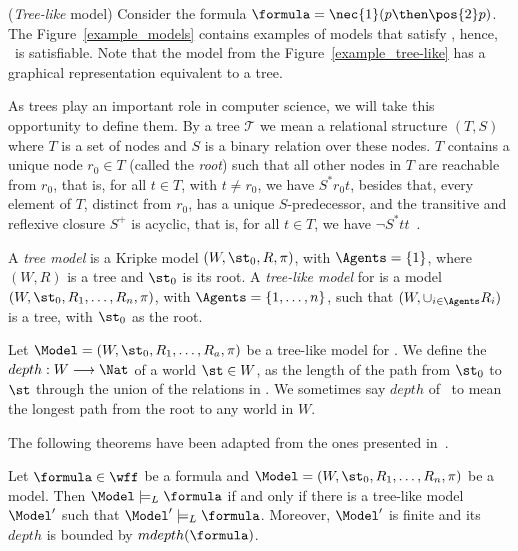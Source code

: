 \begin{example}%
    \label{ex2}
    (\emph{Tree-like} model) Consider the formula $\formula = \nec{1} (p \then
    \pos{2} p)$. The Figure~\ref{example_models} contains examples of models
    that satisfy \formula, hence, \formula\ is satisfiable. Note that the model
    from the Figure~\ref{example_tree-like} has a graphical representation
    equivalent to a tree. 


 
    As trees play an important role in computer science, we will take this
    opportunity to define them. By a tree $\mathcal{T}$ we mean a relational
    structure $(T, S)$ where $T$ is a set of nodes and $S$ is a binary relation
    over these nodes. $T$ contains a unique node $r_0 \in T$ (called the
    \emph{root}) such that all other nodes in $T$ are reachable from $r_0$, that
    is, for all $t \in T$, with $t \neq r_0$, we have $S^*r_0 t$, besides that,
    every element of $T$, distinct from $r_0$, has a unique $S$-predecessor, and
    the transitive and reflexive closure $S^+$ is acyclic, that is, for all $t
    \in T$, we have $\neg S^* t t$~\cite{areces2000tree}.

    A \emph{tree model} is a Kripke model $(W, \st_0, R, \pi)$, with $\Agents =
    \{1\}$, where $(W, R)$ is a tree and $\st_0$ is its root. A \emph{tree-like
    model} for  is a model $(W, \st_0, R_1, \ldots, R_n, \pi)$,
    with $\Agents = \{1, \ldots, n\}$, such that $(W, \cup_{i \in \Agents} R_i)$
    is a tree, with $\st_0$ as the root.

    Let $\Model = (W, \st_0, R_1, \ldots, R_a, \pi)$ be a tree-like model for
    . We define the $depth: W \longrightarrow \Nat$ of a world
    $\st \in W$, as the length of the path from $\st_0$ to $\st$ through the
    union of the relations in \Model. We sometimes say $depth$ of \Model~to mean
    the longest path from the root to any world in $W$.

    The following theorems have been adapted from the ones presented
    in~\cite{areces2000tree}.

    \begin{theorem}%
        \label{theo:tl1}
        Let $\formula \in \wff$ be a formula and $\Model = (W, \st_0, R_1,
        \ldots, R_n, \pi)$ be a model. Then $\Model \models_L \formula$ if and only if
        there is a tree-like model $\Model'$ such that $\Model' \models_L \formula$.
        Moreover, $\Model'$ is finite and its $depth$ is bounded by
        $mdepth(\formula)$.
    \end{theorem}


\end{example}
